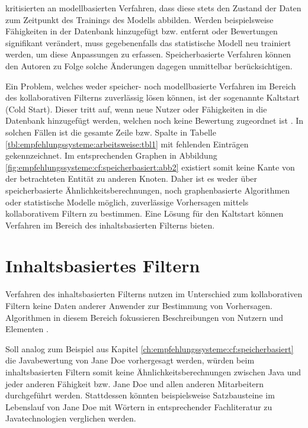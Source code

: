 \textcite[S. 1f.]{pennock:2000} kritisierten an modellbasierten Verfahren, dass diese stets den Zustand der Daten zum Zeitpunkt des Trainings des Modells abbilden. Werden beispielsweise Fähigkeiten in der Datenbank hinzugefügt bzw. entfernt oder Bewertungen signifikant verändert, muss gegebenenfalls das statistische Modell neu trainiert werden, um diese Anpassungen zu erfassen. Speicherbasierte Verfahren können den Autoren zu Folge solche Änderungen dagegen unmittelbar berücksichtigen.

Ein Problem, welches weder speicher- noch modellbasierte Verfahren im Bereich des kollaborativen Filterns zuverlässig lösen können, ist der sogenannte Kaltstart (Cold Start). Dieser tritt auf, wenn neue Nutzer oder Fähigkeiten in die Datenbank hinzugefügt werden, welchen noch keine Bewertung zugeordnet ist \cite[S. 5]{huang:2004}. In solchen Fällen ist die gesamte Zeile bzw. Spalte in Tabelle \ref{tbl:empfehlungssysteme:arbeitsweise:tbl1} mit fehlenden Einträgen gekennzeichnet. Im entsprechenden Graphen in Abbildung \ref{fig:empfehlungssysteme:cf:speicherbasiert:abb2} existiert somit keine Kante von der betrachteten Entität zu anderen Knoten. Daher ist es weder über speicherbasierte Ähnlichkeitsberechnungen, noch graphenbasierte Algorithmen oder statistische Modelle möglich, zuverlässige Vorhersagen mittels kollaborativem Filtern zu bestimmen. Eine Lösung für den Kaltstart können Verfahren im Bereich des inhaltsbasierten Filterns bieten. %

\section{Inhaltsbasiertes Filtern}
\label{ch:empfehlungssysteme:inhaltsbasiertesFiltern}
Verfahren des inhaltsbasierten Filterns nutzen im Unterschied zum kollaborativen Filtern keine Daten anderer Anwender zur Bestimmung von Vorhersagen. Algorithmen in diesem Bereich fokussieren Beschreibungen von Nutzern und Elementen \cite[S. 139f.]{recommenderSystems:2016}.

Soll analog zum Beispiel aus Kapitel \ref{ch:empfehlungssysteme:cf:speicherbasiert} die Javabewertung von Jane Doe vorhergesagt werden, würden beim inhaltsbasierten Filtern somit keine Ähnlichkeitsberechnungen zwischen Java und jeder anderen Fähigkeit bzw. Jane Doe und allen anderen Mitarbeitern durchgeführt werden. Stattdessen könnten beispielsweise Satzbausteine im Lebenslauf von Jane Doe mit Wörtern in entsprechender Fachliteratur zu Javatechnologien verglichen werden.

